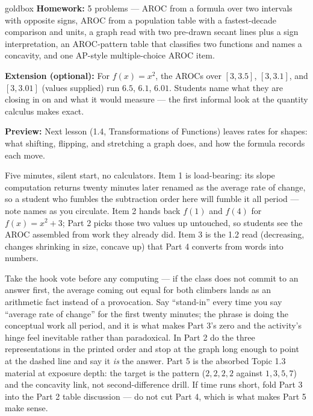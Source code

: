 \documentclass[10pt]{article}
\begin{document}
\begin{skillbox}{goldbox}
\textbf{Homework:} 5 problems --- AROC from a formula over two intervals with
opposite signs, AROC from a population table with a fastest-decade comparison
and units, a graph read with two pre-drawn secant lines plus a sign
interpretation, an AROC-pattern table that classifies two functions and names
a concavity, and one AP-style multiple-choice AROC item.

\textbf{Extension (optional):} For $f(x) = x^2$, the AROCs over $[3, 3.5]$,
$[3, 3.1]$, and $[3, 3.01]$ (values supplied) run $6.5$, $6.1$, $6.01$.
Students name what they are closing in on and what it would measure --- the
first informal look at the quantity calculus makes exact.

\textbf{Preview:} Next lesson (1.4, Transformations of Functions) leaves rates
for shapes: what shifting, flipping, and stretching a graph does, and how the
formula records each move.
\end{skillbox}

\begin{teachernote}[Warm-Up]
Five minutes, silent start, no calculators. Item 1 is load-bearing: its slope
computation returns twenty minutes later renamed as the average rate of
change, so a student who fumbles the subtraction order here will fumble it all
period --- note names as you circulate. Item 2 hands back $f(1)$ and $f(4)$
for $f(x)=x^2+3$; Part 2 picks those two values up untouched, so students see
the AROC assembled from work they already did. Item 3 is the 1.2 read
(decreasing, changes shrinking in size, concave up) that Part 4 converts from
words into numbers.
\end{teachernote}

\begin{teachernote}
Take the hook vote before any computing --- if the class does not commit to an
answer first, the average coming out equal for both climbers lands as an
arithmetic fact instead of a provocation. Say ``stand-in'' every time you say
``average rate of change'' for the first twenty minutes; the phrase is doing
the conceptual work all period, and it is what makes Part 3's zero and the
activity's hinge feel inevitable rather than paradoxical. In Part 2 do the
three representations in the printed order and stop at the graph long enough
to point at the dashed line and say it \textit{is} the answer. Part 5 is the
absorbed Topic 1.3 material at exposure depth: the target is the pattern
($2,2,2,2$ against $1,3,5,7$) and the concavity link, not second-difference
drill. If time runs short, fold Part 3 into the Part 2 table discussion --- do
not cut Part 4, which is what makes Part 5 make sense.
\end{teachernote}
\end{document}
